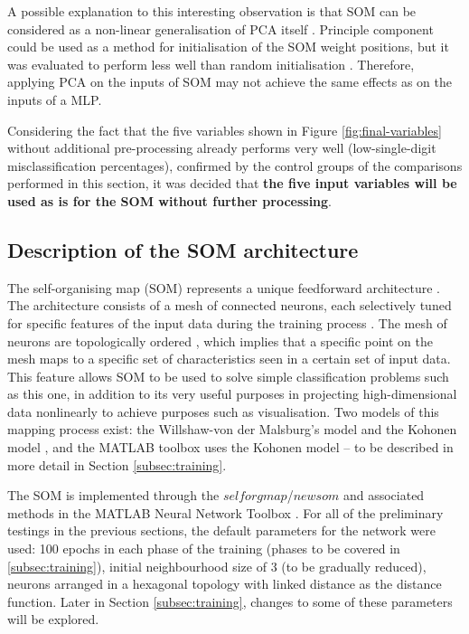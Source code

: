 \documentclass[10pt, oneside]{article}
\begin{document}
A possible explanation to this interesting observation is that SOM can be considered as a non-linear generalisation of PCA itself \cite[p. 1]{akinduko2012initialization}. Principle component could be used as a method for initialisation of the SOM weight positions, but it was evaluated to perform less well than random initialisation \cite[p. 1]{akinduko2012initialization}. Therefore, applying PCA on the inputs of SOM may not achieve the same effects as on the inputs of a MLP. 

Considering the fact that the five variables shown in Figure \ref{fig:final-variables} without additional pre-processing already performs very well (low-single-digit misclassification percentages), confirmed by the control groups of the comparisons performed in this section, it was decided that \textbf{the five input variables will be used as is for the SOM without further processing}.

\subsection{Description of the SOM architecture}

The self-organising map (SOM) represents a unique feedforward architecture \cite[p. 429]{haykin2008}. The architecture consists of a mesh of connected neurons, each selectively tuned for specific features of the input data during the training process \cite[Sec. 9.1]{haykin2008}. The mesh of neurons are topologically ordered \cite[p. 11]{som-lecture}, which implies that a specific point on the mesh maps to a specific set of characteristics seen in a certain set of input data. This feature allows SOM to be used to solve simple classification problems such as this one, in addition to its very useful purposes in projecting high-dimensional data nonlinearly to achieve purposes such as visualisation. Two models of this mapping process exist: the Willshaw-von der Malsburg's model and the Kohonen model \cite[Sec. 9.2]{haykin2008}, and the MATLAB toolbox uses the Kohonen model \cite{som-matlab} -- to be described in more detail in Section \ref{subsec:training}.

The SOM is implemented through the $selforgmap$/$newsom$ and associated methods in the MATLAB Neural Network Toolbox \cite{kohonen2014matlab}. For all of the preliminary testings in the previous sections, the default parameters for the network were used: 100 epochs in each phase of the training (phases to be covered in \ref{subsec:training}), initial neighbourhood size of 3 (to be gradually reduced), neurons arranged in a hexagonal topology with linked distance as the distance function. Later in Section \ref{subsec:training}, changes to some of these parameters will be explored.
\end{document}
